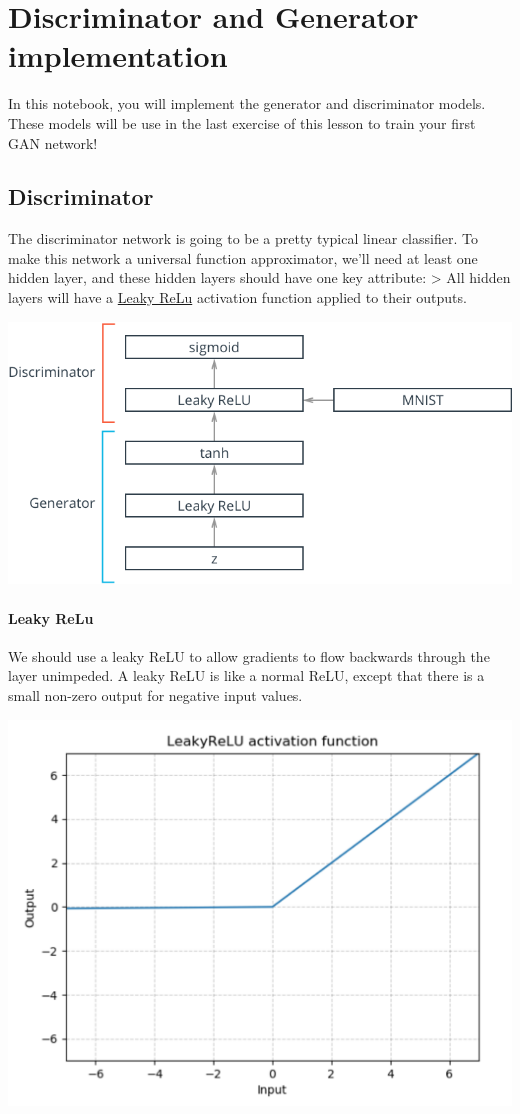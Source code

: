 \section{Discriminator and Generator
implementation}\label{discriminator-and-generator-implementation}

In this notebook, you will implement the generator and discriminator
models. These models will be use in the last exercise of this lesson to
train your first GAN network!

\subsection{Discriminator}\label{discriminator}

The discriminator network is going to be a pretty typical linear
classifier. To make this network a universal function approximator,
we'll need at least one hidden layer, and these hidden layers should
have one key attribute: \textgreater{} All hidden layers will have a
\href{https://pytorch.org/docs/stable/nn.html\#torch.nn.LeakyReLU}{Leaky ReLu} activation function applied to their outputs.

\includegraphics[width=0.5\linewidth]{img//genAdvNet//gan/gan_network.png}

\paragraph{Leaky ReLu}\label{leaky-relu}

We should use a leaky ReLU to allow gradients to flow backwards through
the layer unimpeded. A leaky ReLU is like a normal ReLU, except that
there is a small non-zero output for negative input values.

\includegraphics[width=0.5\linewidth]{img//genAdvNet//gan/leaky_relu.png}

